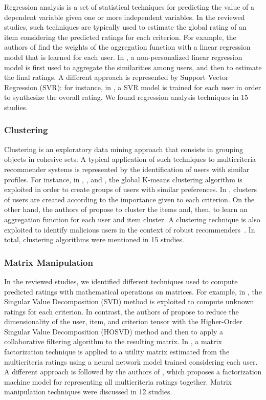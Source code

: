 Regression analysis is a set of statistical techniques for predicting the value of a dependent variable given one or more independent variables. In the reviewed studies, such techniques are typically used to estimate the global rating of an item considering the predicted ratings for each criterion. For example, the authors of  find the weights of the aggregation function with a linear regression model that is learned for each user. In , a non-personalized linear regression model is first used to aggregate the similarities among users, and then to estimate the final ratings. A different approach is represented by Support Vector Regression (SVR): for instance, in , a SVR model is trained for each user in order to synthesize the overall rating. We found regression analysis techniques in 15 studies.

\subsubsection{Clustering}

Clustering is an exploratory data mining approach that consists in grouping objects in cohesive sets. A typical application of such techniques to multicriteria recommender systems is represented by the identification of users with similar profiles. For instance, in , , and , the global K-means clustering algorithm is exploited in order to create groups of users with similar preferences. In , clusters of users are created according to the importance given to each criterion. On the other hand, the authors of  propose to cluster the items and, then, to learn an aggregation function for each user and item cluster. A clustering technique is also exploited to identify malicious users in the context of robust recommenders~. In total, clustering algorithms were mentioned in 15 studies.

\subsubsection{Matrix Manipulation}

In the reviewed studies, we identified different techniques used to compute predicted ratings with mathematical operations on matrices. For example, in , the Singular Value Decomposition (SVD) method is exploited to compute unknown ratings for each criterion. In contrast, the authors of  propose to reduce the dimensionality of the user, item, and criterion tensor with the Higher-Order Singular Value Decomposition (HOSVD) method and then to apply a collaborative filtering algorithm to the resulting matrix. In , a matrix factorization technique is applied to a utility matrix estimated from the multicriteria ratings using a neural network model trained considering each user. A different approach is followed by the authors of , which proposes a factorization machine model for representing all multicriteria ratings together. Matrix manipulation techniques were discussed in 12 studies.

